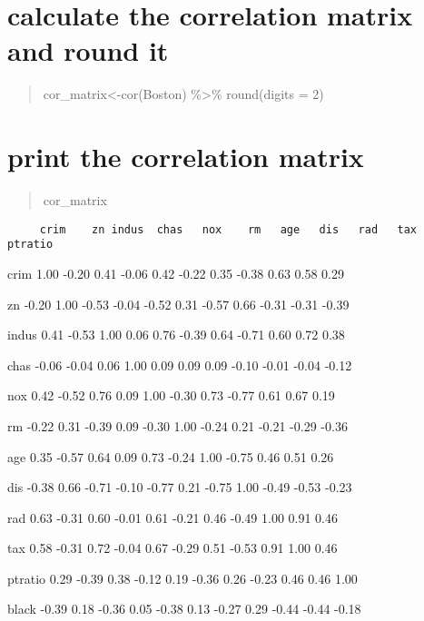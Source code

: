 \documentclass[]{article}
\begin{document}
\section{calculate the correlation matrix and round
it}\label{calculate-the-correlation-matrix-and-round-it-1}

\begin{quote}
cor\_matrix\textless{}-cor(Boston) \%\textgreater{}\% round(digits = 2)
\end{quote}

\begin{quote}
\end{quote}

\section{print the correlation
matrix}\label{print-the-correlation-matrix-1}

\begin{quote}
cor\_matrix
\end{quote}

\begin{verbatim}
     crim    zn indus  chas   nox    rm   age   dis   rad   tax ptratio 
\end{verbatim}

crim 1.00 -0.20 0.41 -0.06 0.42 -0.22 0.35 -0.38 0.63 0.58 0.29

zn -0.20 1.00 -0.53 -0.04 -0.52 0.31 -0.57 0.66 -0.31 -0.31 -0.39

indus 0.41 -0.53 1.00 0.06 0.76 -0.39 0.64 -0.71 0.60 0.72 0.38

chas -0.06 -0.04 0.06 1.00 0.09 0.09 0.09 -0.10 -0.01 -0.04 -0.12

nox 0.42 -0.52 0.76 0.09 1.00 -0.30 0.73 -0.77 0.61 0.67 0.19

rm -0.22 0.31 -0.39 0.09 -0.30 1.00 -0.24 0.21 -0.21 -0.29 -0.36

age 0.35 -0.57 0.64 0.09 0.73 -0.24 1.00 -0.75 0.46 0.51 0.26

dis -0.38 0.66 -0.71 -0.10 -0.77 0.21 -0.75 1.00 -0.49 -0.53 -0.23

rad 0.63 -0.31 0.60 -0.01 0.61 -0.21 0.46 -0.49 1.00 0.91 0.46

tax 0.58 -0.31 0.72 -0.04 0.67 -0.29 0.51 -0.53 0.91 1.00 0.46

ptratio 0.29 -0.39 0.38 -0.12 0.19 -0.36 0.26 -0.23 0.46 0.46 1.00

black -0.39 0.18 -0.36 0.05 -0.38 0.13 -0.27 0.29 -0.44 -0.44 -0.18
\end{document}
